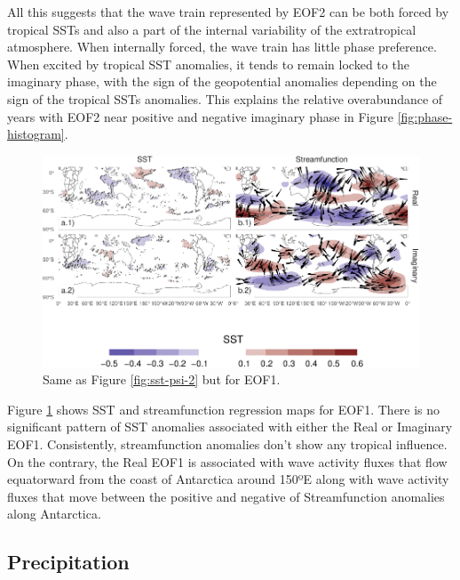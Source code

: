 \documentclass[smallextended]{svjour3}       %
\begin{document}
All this suggests that the wave train represented by EOF2 can be both forced by tropical SSTs and also a part of the internal variability of the extratropical atmosphere. When internally forced, the wave train has little phase preference. When excited by tropical SST anomalies, it tends to remain locked to the imaginary phase, with the sign of the geopotential anomalies depending on the sign of the tropical SSTs anomalies. This explains the relative overabundance of years with EOF2 near positive and negative imaginary phase in Figure \ref{fig:phase-histogram}.



\begin{figure}
\centering
\includegraphics{../figures/sst-psi-1-1.pdf}
\caption{\label{fig:sst-psi-1}Same as Figure \ref{fig:sst-psi-2} but for EOF1.}
\end{figure}

Figure \ref{fig:sst-psi-1} shows SST and streamfunction regression maps for EOF1. There is no significant pattern of SST anomalies associated with either the Real or Imaginary EOF1. Consistently, streamfunction anomalies don't show any tropical influence. On the contrary, the Real EOF1 is associated with wave activity fluxes that flow equatorward from the coast of Antarctica around 150ºE along with wave activity fluxes that move between the positive and negative of Streamfunction anomalies along Antarctica.

\hypertarget{precipitation}{%
\subsection{Precipitation}\label{precipitation}}
\end{document}
